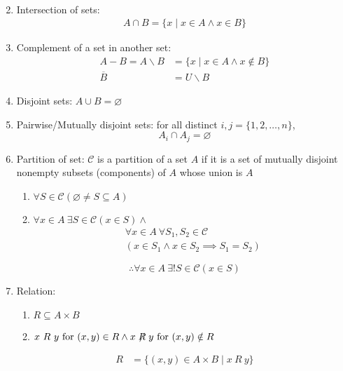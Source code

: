 \documentclass[landscape, a4paper]{article}
\newcommand{\C}{\mathscr{C}}
\renewcommand{\and}{\wedge}
\begin{document}
\begin{multicols*}{4}
\begin{enumerate}[wide, labelindent=2pt]
\begin{align*}
              \end{align*}
        \item Intersection of sets:
              \begin{align*}
                  A \cap B=\{x\mid x\in A \and x\in B\}
              \end{align*}
        \item Complement of a set in another set:
              \begin{align*}
                  A-B=A\backslash B & =\{x\mid x \in A \and x\notin B\} \\
                  \overline{B}      & =U\backslash B
              \end{align*}
        \item Disjoint sets: $A\cup B=\varnothing$
        \item Pairwise/Mutually disjoint sets: for all distinct
              $i,j=\{1,2,\ldots,n\}$,
              \[
                  A_i\cap A_j=\varnothing
              \]
        \item Partition of set: $\C$ is a partition of a set $A$ if it is a set of mutually disjoint nonempty subsets (components) of $A$ whose union is $A$
              \begin{enumerate}
                  \item $\forall S\in\C(\varnothing\neq S\subseteq A)$
                  \item $\forall x \in A\ \exists S \in \C  (x\in S)\and$
                        \begin{multline*}
                            \forall x\in A\ \forall S_1,S_2\in\C \\ (x\in S_1\and x\in S_2 \implies S_1=S_2)
                        \end{multline*}
              \end{enumerate}
              \[
                  \therefore \forall x \in A\ \exists ! S\in\C (x\in S)
              \]
        \item Relation:
              \begin{enumerate}
                  \item $R\subseteq  A\times B$
                  \item $x\ R\ y \text{ for }(x,y)\in R \and x \centernot{R} y \text{ for }(x,y)\notin R$
              \end{enumerate}
              \begin{align*}
                  R      & = \{(x,y)\in A\times B \mid x\ R\ y\}      \\

\end{align*}
\end{enumerate}
\end{multicols*}
\end{document}
